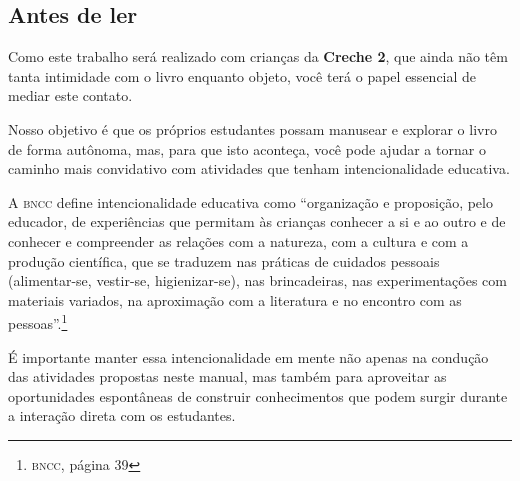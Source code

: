\documentclass[11pt]{extarticle}
\begin{document}
\subsection{Antes de ler}


Como este trabalho será realizado com crianças da \textbf{Creche 2}, 
que ainda não têm tanta intimidade com o livro enquanto objeto, você terá o 
papel essencial de mediar este contato. 

Nosso objetivo é que os próprios estudantes possam manusear 
e explorar o livro de forma autônoma, mas, para que isto aconteça, você 
pode ajudar a tornar o caminho mais convidativo com atividades que tenham 
intencionalidade educativa. 

A \textsc{bncc} define intencionalidade educativa como ``organização 
e proposição, pelo educador, de experiências que permitam às crianças 
conhecer a si e ao outro e de conhecer e compreender as relações com a 
natureza, com a cultura e com a produção científica, que se traduzem nas 
práticas de cuidados pessoais (alimentar-se, vestir-se, higienizar-se), 
nas brincadeiras, nas experimentações com materiais 
variados, na aproximação com a literatura e no encontro com as 
pessoas''.\footnote{\textsc{bncc}, página 39}

É importante manter essa intencionalidade em mente não apenas na condução 
das atividades propostas neste manual, mas também para aproveitar as 
oportunidades espontâneas de construir conhecimentos que podem surgir durante 
a interação direta com os estudantes.
\end{document}
